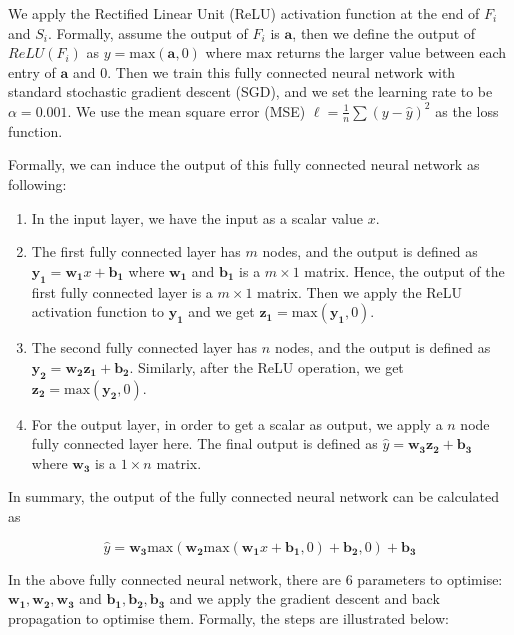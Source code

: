 We apply the Rectified Linear Unit (ReLU) activation function at the end of $F_i$ and $S_i$. Formally, assume the output of $F_i$ is $\boldsymbol{a}$, then we define the output of $\textit{ReLU}(F_i)$ as $y=\text{max}(\boldsymbol{a}, 0)$ where $\text{max}$ returns the larger value between each entry of $\boldsymbol{a}$ and $0$. Then we train this fully connected neural network with standard stochastic gradient descent (SGD), and we set the learning rate to be $\alpha=0.001$. We use the mean square error (MSE) $\ell=\frac{1}{n}\sum(y-\hat{y})^2$ as the loss function.

Formally, we can induce the output of this fully connected neural network as following:

\begin{enumerate}
	\item In the input layer, we have the input as a scalar value $x$.
	\item The first fully connected layer has $m$ nodes, and the output is defined as $\boldsymbol{y_1}=\boldsymbol{w_1}x+\boldsymbol{b_1}$ where $\boldsymbol{w_1}$ and $\boldsymbol{b_1}$ is a $m\times 1$ matrix. Hence, the output of the first fully connected layer is a $m\times 1$ matrix. Then we apply the ReLU activation function to $\boldsymbol{y_1}$ and we get $\boldsymbol{z_1}=\text{max}(\boldsymbol{y_1}, 0)$.
	\item The second fully connected layer has $n$ nodes, and the output is defined as $\boldsymbol{y_2}=\boldsymbol{w_2}\boldsymbol{z_1}+\boldsymbol{b_2}$. Similarly, after the ReLU operation, we get $\boldsymbol{z_2}=\text{max}(\boldsymbol{y_2}, 0)$.
	\item For the output layer, in order to get a scalar as output, we apply a $n$ node fully connected layer here. The final output is defined as $\hat{y}=\boldsymbol{w_3}\boldsymbol{z_2}+\boldsymbol{b_3}$ where $\boldsymbol{w_3}$ is a $1\times n$ matrix.
\end{enumerate}

In summary, the output of the fully connected neural network can be calculated as

\begin{equation}
\label{output_of_fcn}
	\hat{y}=\boldsymbol{w_3}\text{max}(\boldsymbol{w_2}\text{max}(\boldsymbol{w_1}x+\boldsymbol{b_1},0)+\boldsymbol{b_2},0)+\boldsymbol{b_3}
\end{equation}

In the above fully connected neural network, there are 6 parameters to optimise: $\boldsymbol{w_1}, \boldsymbol{w_2}, \boldsymbol{w_3}$ and $\boldsymbol{b_1}, \boldsymbol{b_2}, \boldsymbol{b_3}$ and we apply the gradient descent and back propagation to optimise them. Formally, the steps are illustrated below:

